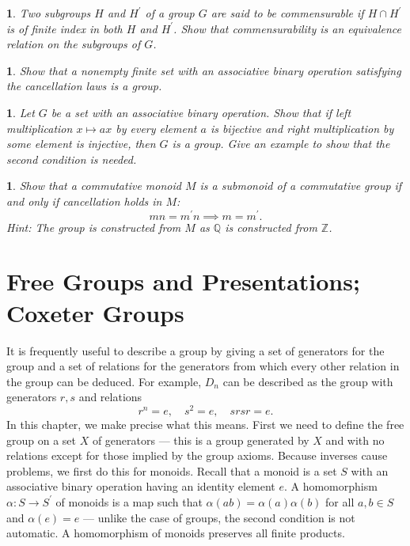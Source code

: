 \documentclass[a4paper,11pt,final,openany]{memoir}%
\newtheorem{exercise}[Y]{}
\theoremstyle{nonumberplain}
\begin{document}
\begin{exercise}
\label{x4b}Two subgroups $H$ and $H^{\prime}$ of a group $G$ are said to be
\emph{commensurable} if $H\cap H^{\prime}$ is of finite index in both $H$ and
$H^{\prime}$. Show that commensurability is an equivalence relation on the
subgroups of $G$.
\end{exercise}

\begin{exercise}
\label{x4c}Show that a nonempty finite set with an associative binary
operation satisfying the cancellation laws is a group.
\end{exercise}

\begin{exercise}
\label{x4e}Let $G$ be a set with an associative binary operation. Show that if
left multiplication $x\mapsto ax$ by every element $a$ is bijective and right
multiplication by some element is injective, then $G$ is a group. Give an
example to show that the second condition is needed.
\end{exercise}

\begin{exercise}
\label{x0}Show that a commutative monoid $M$ is a submonoid of a commutative
group if and only if cancellation holds in $M$:%
\[
mn=m^{\prime}n\implies m=m^{\prime}.
\]
Hint: The group is constructed from $M$ as $\mathbb{Q}{}$ is constructed from
$\mathbb{Z}{}$.
\end{exercise}

\clearpage


\chapter{Free Groups and Presentations; Coxeter Groups}

It is frequently useful to describe a group by giving a set of generators for
the group and a set of relations for the generators from which every other
relation in the group can be deduced. For example, $D_{n}$ can be described as
the group with generators $r,s$ and relations
\[
r^{n}=e,\quad s^{2}=e,\quad srsr=e.
\]
In this chapter, we make precise what this means. First we need to define the
free group on a set $X$ of generators --- this is a group generated by $X$ and
with no relations except for those implied by the group axioms. Because
inverses cause problems, we first do this for monoids. Recall that a monoid is
a set $S$ with an associative binary operation having an identity element $e$.
A homomorphism $\alpha\colon S\rightarrow S^{\prime}$ of monoids is a map such
that $\alpha(ab)=\alpha(a)\alpha(b)$ for all $a,b\in S$ and $\alpha(e)=e$ ---
unlike the case of groups, the second condition is not automatic. A
homomorphism of monoids preserves all finite products.
\end{document}
